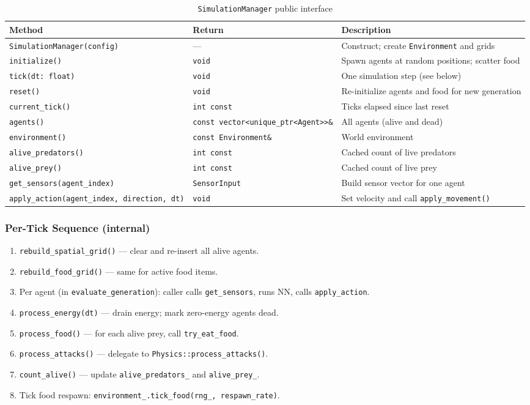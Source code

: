 \begin{table}[H]
\centering\small
\caption{\texttt{SimulationManager} public interface}
\begin{tabularx}{\textwidth}{@{}llX@{}}
\toprule
\textbf{Method} & \textbf{Return} & \textbf{Description} \\
\midrule
\texttt{SimulationManager(config)} & — & Construct; create \texttt{Environment} and grids \\
\texttt{initialize()} & \texttt{void} & Spawn agents at random positions; scatter food \\
\texttt{tick(dt: float)} & \texttt{void} & One simulation step (see below) \\
\texttt{reset()} & \texttt{void} & Re-initialize agents and food for new generation \\
\texttt{current\_tick()} & \texttt{int const} & Ticks elapsed since last reset \\
\texttt{agents()} & \texttt{const vector<unique\_ptr<Agent>>\&} & All agents (alive and dead) \\
\texttt{environment()} & \texttt{const Environment\&} & World environment \\
\texttt{alive\_predators()} & \texttt{int const} & Cached count of live predators \\
\texttt{alive\_prey()} & \texttt{int const} & Cached count of live prey \\
\texttt{get\_sensors(agent\_index)} & \texttt{SensorInput} & Build sensor vector for one agent \\
\texttt{apply\_action(agent\_index, direction, dt)} & \texttt{void} & Set velocity and call \texttt{apply\_movement()} \\
\bottomrule
\end{tabularx}
\end{table}

\subsubsection{Per-Tick Sequence (internal)}
\begin{enumerate}[nosep]
  \item \texttt{rebuild\_spatial\_grid()} — clear and re-insert all alive agents.
  \item \texttt{rebuild\_food\_grid()} — same for active food items.
  \item Per agent (in \texttt{evaluate\_generation}): caller calls
    \texttt{get\_sensors}, runs NN, calls \texttt{apply\_action}.
  \item \texttt{process\_energy(dt)} — drain energy; mark zero-energy agents dead.
  \item \texttt{process\_food()} — for each alive prey, call \texttt{try\_eat\_food}.
  \item \texttt{process\_attacks()} — delegate to \texttt{Physics::process\_attacks()}.
  \item \texttt{count\_alive()} — update \texttt{alive\_predators\_} and
    \texttt{alive\_prey\_}.
  \item Tick food respawn: \texttt{environment\_.tick\_food(rng\_, respawn\_rate)}.
\end{enumerate}

